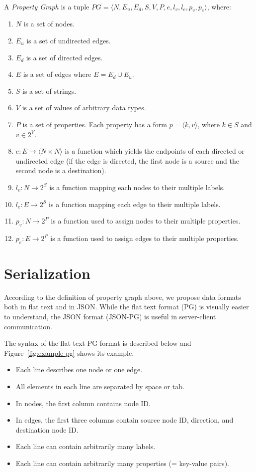 \documentclass[runningheads]{llncs}
\begin{document}
\begin{defi}
\leavevmode \vspace{1mm} \\
A \emph{Property Graph} is a tuple
$PG = \langle N, E_u, E_d, S, V, P, e, l_v, l_e, p_v, p_e\rangle$, where:
\begin{enumerate}
    \item $N$ is a set of nodes.
    \item $E_u$ is a set of undirected edges.
    \item $E_d$ is a set of directed edges.
    \item $E$ is a set of edges where $E = E_d \cup E_u$.
    \item $S$ is a set of strings.
    \item $V$ is a set of values of arbitrary data types.
    \item $P$ is a set of properties. Each property has a form $p = \langle k,v \rangle$, where $k \in S$ and $v \in 2^V$.
    \item $e: E \to \langle N \times N \rangle$ is a function which yields the endpoints of each directed or undirected edge (if the edge is directed, the first node is a source and the second node is a destination).
    \item $l_v : N \to 2^S$ is a function mapping each nodes to their multiple labels.
    \item $l_e : E \to 2^S$ is a function mapping each edge to their multiple labels.
    \item $p_v : N \to 2^P$ is a function used to assign nodes to their multiple properties.
    \item $p_e : E \to 2^P$ is a function used to assign edges to their multiple properties.
\end{enumerate}
\end{defi}

\section{Serialization}
According to the definition of property graph above, we propose data formats both in flat text and in JSON. While the flat text format (PG) is visually easier to understand, the JSON format (JSON-PG) is useful in server-client communication.

The syntax of the flat text PG format is described below and Figure~\ref{fig:example-pg} shows its example.

\begin{itemize}
    \item Each line describes one node or one edge.
    \item All elements in each line are separated by space or tab.
    \item In nodes, the first column contains node ID.
    \item In edges, the first three columns contain source node ID, direction, and destination node ID.
    \item Each line can contain arbitrarily many labels.
    \item Each line can contain arbitrarily many properties (= key-value pairs).
\end{itemize}
\end{document}
